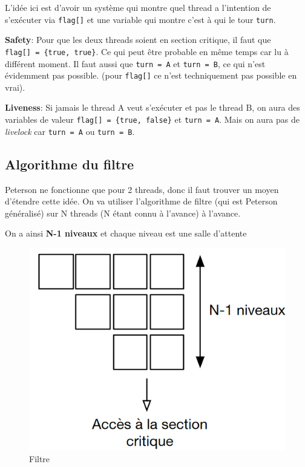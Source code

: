 L'idée ici est d'avoir un système qui montre quel thread a l'intention
de s'exécuter via \texttt{flag{[}{]}} et une variable qui montre c'est à
qui le tour \texttt{turn}.

\textbf{Safety}: Pour que les deux threads soient en section critique,
il faut que \texttt{flag{[}{]}\ =\ \{true,\ true\}}. Ce qui peut être
probable en même temps car lu à différent moment. Il faut aussi que
\texttt{turn\ =\ A} et \texttt{turn\ =\ B}, ce qui n'est évidemment pas
possible. (pour \texttt{flag{[}{]}} ce n'est techniquement pas possible
en vrai).

\textbf{Liveness}: Si jamais le thread A veut s'exécuter et pas le
thread B, on aura des variables de valeur
\texttt{flag{[}{]}\ =\ \{true,\ false\}} et \texttt{turn\ =\ A}. Mais on
aura pas de \emph{livelock} car \texttt{turn\ =\ A} ou
\texttt{turn\ =\ B}.

\subsection{Algorithme du filtre}\label{algorithme-du-filtre}

Peterson ne fonctionne que pour 2 threads, donc il faut trouver un moyen
d'étendre cette idée. On va utiliser l'algorithme de filtre (qui est
Peterson généralisé) sur N threads (N étant connu à l'avance) à
l'avance.

On a ainsi \textbf{N-1 niveaux} et chaque niveau est une salle d'attente

\begin{figure}
\centering
\includegraphics{image-25.png}
\caption{Filtre}
\end{figure}

